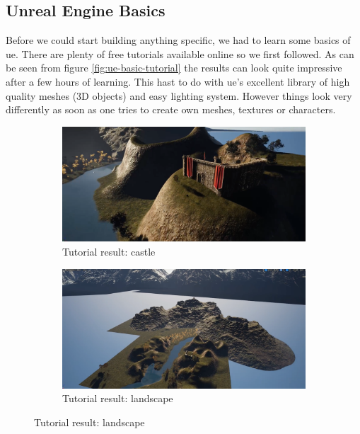 \documentclass[
  a4paper,  %
  twoside,  %
  bibliography=totoc,
  headsepline,
  cleardoublepage=empty,
  parskip=half,
  draft=false
]{scrbook}
\begin{document}
\subsection*{Unreal Engine Basics}
Before we could start building anything specific, we had to learn some basics of \gls{ue}. There are plenty of free tutorials available online so we first followed. As can be seen from figure \ref{fig:ue-basic-tutorial} the results can look quite impressive after a few hours of learning. This hast to do with \gls{ue}'s excellent library of high quality meshes (3D objects) and easy lighting system. However things look very differently as soon as one tries to create own meshes, textures or characters. 

\begin{figure}[h]
  \centering
  \begin{subfigure}{0.45\textwidth}
    \includegraphics[width=\linewidth]{graphics/images/unreal-engine/Basics/Landscape-Castle.png}
    \caption{Tutorial result: castle}
  \end{subfigure}
  \begin{subfigure}{0.45\textwidth}
    \includegraphics[width=\linewidth]{graphics/images/unreal-engine/Basics/Landscape-Overview.png}
    \caption{Tutorial result: landscape}
  \end{subfigure}


\end{figure}
\end{document}
